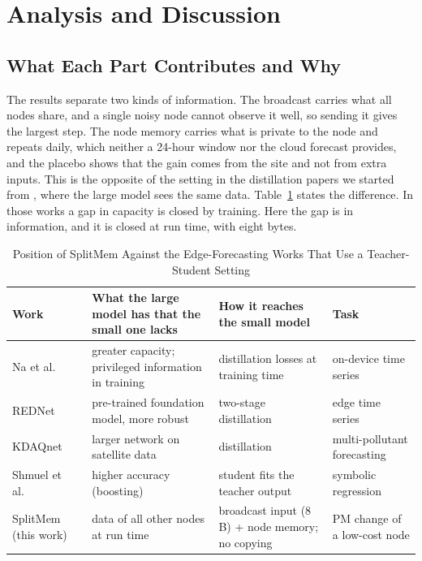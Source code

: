 \documentclass[journal]{IEEEtran}
\begin{document}
\begin{table}[!htb]
\caption{Other Comparisons: Change of RMSE (\%) With 95\% CI at Known Places}
\label{tab:other}
\centering\footnotesize
\setlength{\tabcolsep}{3pt}

\end{table}

\section{Analysis and Discussion}
\label{sec:discussion}
\subsection{What Each Part Contributes and Why}
The results separate two kinds of information. The broadcast carries what all nodes share, and a single noisy node cannot observe it well, so sending it gives the largest step. The node memory carries what is private to the node and repeats daily, which neither a 24-hour window nor the cloud forecast provides, and the placebo shows that the gain comes from the site and not from extra inputs. This is the opposite of the setting in the distillation papers we started from \cite{na2026privileged,fu2026rednet}, where the large model sees the same data. Table~\ref{tab:position} states the difference. In those works a gap in capacity is closed by training. Here the gap is in information, and it is closed at run time, with eight bytes.

\begin{table}[!t]
\caption{Position of SplitMem Against the Edge-Forecasting Works That Use a Teacher-Student Setting}
\label{tab:position}
\centering\footnotesize
\setlength{\tabcolsep}{3pt}
\begin{tabular}{|l|l|l|l|}
\hline
Work & What the large model has that the small one lacks & How it reaches the small model & Task \\
\hline
Na et al.~\cite{na2026privileged} & greater capacity; privileged information in training & distillation losses at training time & on-device time series \\
REDNet~\cite{fu2026rednet} & pre-trained foundation model, more robust & two-stage distillation & edge time series \\
KDAQnet~\cite{kumar2026kdaqnet} & larger network on satellite data & distillation & multi-pollutant forecasting \\
Shmuel et al.~\cite{shmuel2026forest} & higher accuracy (boosting) & student fits the teacher output & symbolic regression \\
\hline
SplitMem (this work) & data of all other nodes at run time & broadcast input (8 B) + node memory; no copying & PM change of a low-cost node \\
\hline
\end{tabular}
\end{table}
\end{document}
